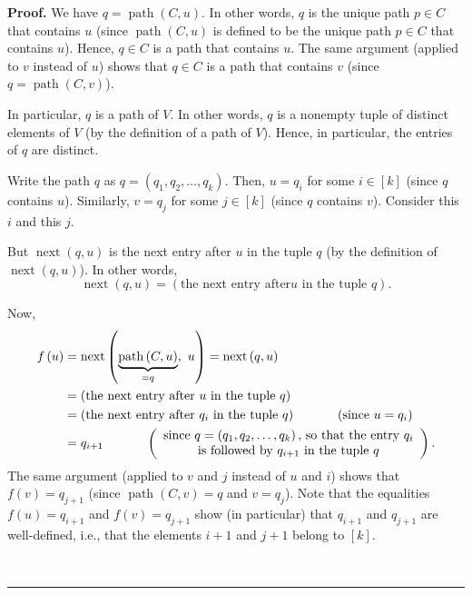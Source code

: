 \documentclass[numbers=enddot,12pt,final,onecolumn,notitlepage]{scrartcl}%
\numberwithin{exer}{section}
\theoremstyle{definition}
\newenvironment{proof}[1][Proof]{\noindent\textbf{#1.} }{\ \rule{0.5em}{0.5em}}
\newenvironment{verlong}{}{}
\begin{document}
\begin{verlong}
\begin{proof}
We have $q=\operatorname*{path}\left(  C,u\right)  $. In other words, $q$ is
the unique path $p\in C$ that contains $u$ (since $\operatorname*{path}\left(
C,u\right)  $ is defined to be the unique path $p\in C$ that contains $u$).
Hence, $q\in C$ is a path that contains $u$. The same argument (applied to $v$
instead of $u$) shows that $q\in C$ is a path that contains $v$ (since
$q=\operatorname*{path}\left(  C,v\right)  $).

In particular, $q$ is a path of $V$. In other words, $q$ is a nonempty tuple
of distinct elements of $V$ (by the definition of a path of $V$). Hence, in
particular, the entries of $q$ are distinct.

Write the path $q$ as $q=\left(  q_{1},q_{2},\ldots,q_{k}\right)  $. Then,
$u=q_{i}$ for some $i\in\left[  k\right]  $ (since $q$ contains $u$).
Similarly, $v=q_{j}$ for some $j\in\left[  k\right]  $ (since $q$ contains
$v$). Consider this $i$ and this $j$.

But $\operatorname*{next}\left(  q,u\right)  $ is the next entry after $u$ in
the tuple $q$ (by the definition of $\operatorname*{next}\left(  q,u\right)
$). In other words,%
\[
\operatorname*{next}\left(  q,u\right)  =\left(  \text{the next entry after
}u\text{ in the tuple }q\right)  .
\]


Now,
\begin{align*}
f\left(  u\right)   &  =\operatorname*{next}\left(
\underbrace{\operatorname*{path}\left(  C,u\right)  }_{=q},\ u\right)
=\operatorname*{next}\left(  q,u\right) \\
&  =\left(  \text{the next entry after }u\text{ in the tuple }q\right) \\
&  =\left(  \text{the next entry after }q_{i}\text{ in the tuple }q\right)
\ \ \ \ \ \ \ \ \ \ \left(  \text{since }u=q_{i}\right) \\
&  =q_{i+1}\ \ \ \ \ \ \ \ \ \ \left(
\begin{array}
[c]{c}%
\text{since }q=\left(  q_{1},q_{2},\ldots,q_{k}\right)  \text{, so that the
entry }q_{i}\\
\text{is followed by }q_{i+1}\text{ in the tuple }q
\end{array}
\right)  .
\end{align*}
The same argument (applied to $v$ and $j$ instead of $u$ and $i$) shows that
$f\left(  v\right)  =q_{j+1}$ (since $\operatorname*{path}\left(  C,v\right)
=q$ and $v=q_{j}$). Note that the equalities $f\left(  u\right)  =q_{i+1}$ and
$f\left(  v\right)  =q_{j+1}$ show (in particular) that $q_{i+1}$ and
$q_{j+1}$ are well-defined, i.e., that the elements $i+1$ and $j+1$ belong to
$\left[  k\right]  $.


\end{proof}
\end{verlong}
\end{document}
